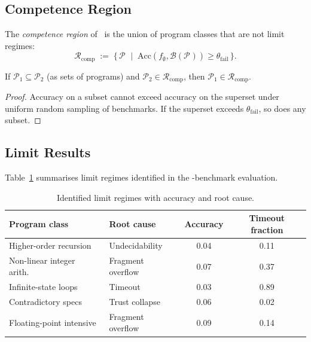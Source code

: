 \documentclass[11pt]{article}
\newcommand{\Acc}{\mathrm{Acc}}             %
\newcommand{\PClass}[1]{\mathcal{P}_{#1}}   %
\newcommand{\Threshold}{\theta}             %
\begin{document}
\subsection{Competence Region}
\label{subsec:competence-region}

The \emph{competence region} of \JuGeo\ is the union of program classes
that are not limit regimes:
\[
  \mathcal{R}_{\mathrm{comp}}
  \;:=\;
  \bigl\{\, \PClass{} \;\mid\;
    \Acc(f_\emptyset, \mathcal{B}(\PClass{})) \geq \Threshold_{\mathrm{fail}}
  \,\bigr\}.
\]

\begin{proposition}
\label{prop:monotone-competence}
If $\PClass{1} \subseteq \PClass{2}$ (as sets of programs) and
$\PClass{2} \in \mathcal{R}_{\mathrm{comp}}$, then
$\PClass{1} \in \mathcal{R}_{\mathrm{comp}}$.
\end{proposition}

\begin{proof}
Accuracy on a subset cannot exceed accuracy on the superset under
uniform random sampling of benchmarks.  If the superset exceeds
$\Threshold_{\mathrm{fail}}$, so does any subset.
\end{proof}

\subsection{Limit Results}
\label{subsec:limit-results}

Table~\ref{tab:limits} summarises limit regimes identified in the
\numcases-benchmark evaluation.

\begin{table}[H]
\centering
\caption{Identified limit regimes with accuracy and root cause.}
\label{tab:limits}
\begin{tabular}{llcc}
\toprule
Program class & Root cause & Accuracy & Timeout fraction \\
\midrule
Higher-order recursion & Undecidability & 0.04 & 0.11 \\
Non-linear integer arith.\ & Fragment overflow & 0.07 & 0.37 \\
Infinite-state loops & Timeout & 0.03 & 0.89 \\
Contradictory specs & Trust collapse & 0.06 & 0.02 \\
Floating-point intensive & Fragment overflow & 0.09 & 0.14 \\
\bottomrule
\end{tabular}
\end{table}
\end{document}
